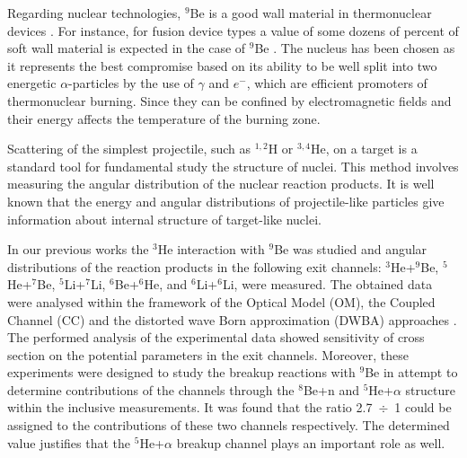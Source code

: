 \documentclass[10pt]{iopart}
\begin{document}
Regarding nuclear technologies, $^9$Be is a good wall material in thermonuclear devices \cite{kukulin2010, seksembayev2018}.
For instance, for fusion device types a value of some dozens of percent of soft wall material is expected in the case of $^9$Be \cite{seksembayev2018}. 
The nucleus  has been chosen as it represents the best compromise based  on its ability to be well split into two energetic $\alpha$-particles by the use of $\gamma$ and $e^-$, which are efficient promoters of thermonuclear burning. Since they can be confined by electromagnetic fields and their energy affects the temperature of the burning zone.

	Scattering of the simplest projectile, such as $^{1,2}$H or $^{3,4}$He, on a target is a standard tool for fundamental study the structure of nuclei. 
	This method involves measuring the angular distribution of the nuclear reaction products.
	It is well known that the energy and angular distributions of projectile-like particles give information about internal structure of target-like nuclei.
	
	In our previous works \cite{lukyanov2014, lukyanov2015, janseitov2018} the $^3$He interaction with $^9$Be was studied and angular distributions of the reaction products in the following exit channels: $^3$He+$^9$Be, $^5$He+$^7$Be, $^5$Li+$^7$Li, $^6$Be+$^6$He, and $^6$Li+$^6$Li, were measured. The obtained data were analysed within the framework of the Optical Model (OM), the Coupled Channel (CC) and the distorted wave Born approximation (DWBA) approaches  . 
	The performed analysis of the experimental data showed  sensitivity of cross section on the potential parameters in the exit channels. 
	Moreover, these experiments were designed to study the breakup reactions with $^9$Be in attempt to determine contributions of the channels through the $^8$Be+n  and  $^5$He+$\alpha$ structure within the inclusive measurements.
	It was found that the ratio 2.7~$\div$~1 could be assigned to the contributions of these two channels respectively. The determined value justifies that the $^5$He+$\alpha$ breakup channel plays an important role as well. 
\end{document}

